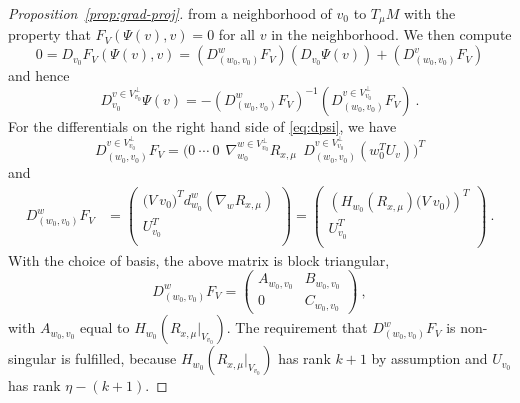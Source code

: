\documentclass[final]{svjour3}
\newcommand{\tm}{d}
\newcommand{\tmp}[1]{\tm^{#1}}
\newcommand{\Hess}{H}
\begin{document}
\begin{proof}[Proposition~\ref{prop:grad-proj}]
from a neighborhood 
of $v_0$ to $T_\mu M$ with the property that $F_V(\Psi(v),v)=0$ for all $v$ in
the neighborhood. We then compute
\begin{equation*}
    0
    =D_{v_0}F_V(\Psi(v),v)
    =
    \left(D^w_{(w_0,v_0)}F_V\right)\left(D_{v_0}\Psi(v)\right)
    +\left(D^v_{(w_0,v_0)}F_V\right)
\end{equation*}
and hence
\begin{equation}
    D^{v\in V_{v_0}^\perp}_{v_0}\Psi(v)
    =
    -\left(D^w_{(w_0,v_0)}F_V\right)^{-1}
    \left(D^{v\in V_{v_0}^\perp}_{(w_0,v_0)}F_V\right)
    \ .
    \label{eq:dpsi}
\end{equation}
For the differentials on the right hand side of \eqref{eq:dpsi}, we have
\begin{equation*}
    D^{v\in V_{v_0}^\perp}_{(w_0,v_0)}F_V
    =
    \Big(
        0\ 
        \cdots\ 
        0\ \ 
        \nabla_{w_0}^{w\in V_{v_0}^\perp}R_{x,\mu}\ \ 
        D^{v\in V_{v_0}^\perp}_{(w_0,v_0)}\left(w_0^TU_v\right)
       \Big)^T
\end{equation*}
 and
\begin{equation}
    \begin{split}
    D^w_{(w_0,v_0)}F_V
    &=
    \begin{pmatrix}
        \Big(V\ v_0\Big)^T\tmp{w}_{w_0}\left(\nabla_w R_{x,\mu}\right) \\
        U_{v_0}^T \\
    \end{pmatrix}
    =
    \begin{pmatrix}
        \left(\Hess_{w_0}\left(R_{x,\mu}\right) \Big(V\ v_0\Big)\right)^T
         \\ 
        U_{v_0}^T \\
    \end{pmatrix}
     \ .
    \end{split}
    \label{eq:dwFv-splitup}
\end{equation}
With the choice of basis, the above matrix is block triangular,
\begin{equation}
    D^w_{(w_0,v_0)}F_V
    =
    \begin{pmatrix}
        A_{w_0,v_0} & B_{w_0,v_0}\\
        0 & C_{w_0,v_0}
    \end{pmatrix}
        \ ,
    \label{eq:blockt}
\end{equation}
with $A_{w_0,v_0}$ equal to $\Hess_{w_0}(R_{x,\mu}|_{V_{v_0}})$.  The
requirement that $D^w_{(w_0,v_0)}F_V$ is non-singular is 
fulfilled, because $\Hess_{w_0}(R_{x,\mu}|_{V_{v_0}})$ has rank $k+1$ by assumption
and $U_{v_0}$ has rank $\eta-(k+1)$.


\end{proof}
\end{document}
